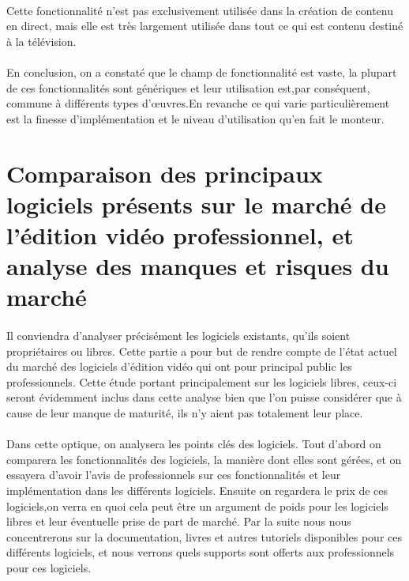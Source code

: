 \paragraph{ }

Cette fonctionnalité n'est pas exclusivement utilisée dans la création
de contenu en direct, mais elle est très largement utilisée dans tout
ce qui est contenu destiné à la télévision.

\paragraph{} \paragraph{}

En conclusion, on a constaté que le champ de fonctionnalité est vaste,
la plupart de ces fonctionnalités sont génériques et leur utilisation
est,par conséquent, commune à différents types d'œuvres.En revanche
ce qui varie particulièrement  est la finesse d'implémentation et le
niveau d'utilisation qu'en fait le monteur.

\newpage \section{Comparaison des principaux logiciels présents sur le
marché de l'édition vidéo professionnel, et analyse des manques et
risques du marché}

\paragraph{}

Il conviendra d'analyser précisément les logiciels existants, qu'ils
soient propriétaires ou libres. Cette partie a pour but de rendre compte
de l'état actuel du marché des logiciels d'édition vidéo qui ont pour
principal public les professionnels. Cette étude portant principalement
sur les logiciels libres, ceux-ci seront évidemment inclus dans cette
analyse bien que l'on puisse considérer que à cause de leur manque de
maturité, ils n'y aient pas totalement leur place.

\paragraph{}

Dans cette optique, on analysera les points clés des logiciels.
Tout d'abord on comparera les fonctionnalités des logiciels, la manière
dont elles sont gérées, et on essayera d'avoir l'avis de professionnels
sur ces fonctionnalités et leur implémentation dans les différents
logiciels. Ensuite on regardera le prix de ces logiciels,on verra en quoi
cela peut être un argument de poids pour les logiciels libres et leur
éventuelle prise de part de marché. Par la suite nous nous concentrerons
sur la documentation, livres et autres tutoriels disponibles pour ces
différents logiciels, et nous verrons quels supports sont offerts aux
professionnels pour ces logiciels.

